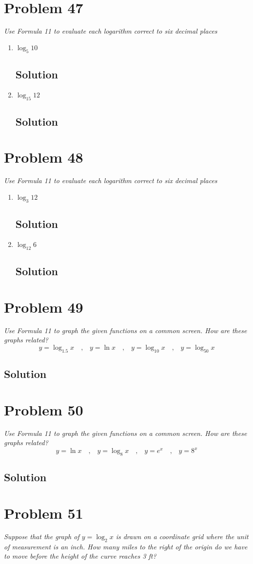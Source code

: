 \documentclass[11pt]{article}
\newcommand{\soln}{\subsection*}
\newcommand{\qn}{\textit}
\newcommand{\eqtext}[1]{\quad\text{#1}\quad}
\begin{document}
\section*{Problem 47}

\qn{Use Formula 11 to evaluate each logarithm correct to six decimal places}
\begin{enumerate}
	\item \qn{$\log_5{10}$}
	\soln{Solution}
	
	\item \qn{$\log_{15}{12}$}
	\soln{Solution}
\end{enumerate}

\section*{Problem 48}

\qn{Use Formula 11 to evaluate each logarithm correct to six decimal places}
\begin{enumerate}
	\item \qn{$\log_3{12}$}
	\soln{Solution}
	
	\item \qn{$\log_{12}6$}
	\soln{Solution}
\end{enumerate}

\section*{Problem 49}

\qn{Use Formula 11 to graph the given functions on a common screen. How are these graphs related? $$y=\log_{1.5}x \eqtext{,} y=\ln{x} \eqtext{,} y=\log_{10}x \eqtext{,} y=\log_{50}x$$}

\soln{Solution}

\section*{Problem 50}

\qn{Use Formula 11 to graph the given functions on a common screen. How are these graphs related? $$y=\ln{x} \eqtext{,} y=\log_8{x} \eqtext{,} y=e^x \eqtext{,} y=8^x$$}

\soln{Solution}

\section*{Problem 51}

\qn{Suppose that the graph of $y=\log_2{x}$ is drawn on a coordinate grid where the unit of measurement is an inch. How many miles to the right of the origin do we have to move before the height of the curve reaches 3 ft?}
\end{document}
